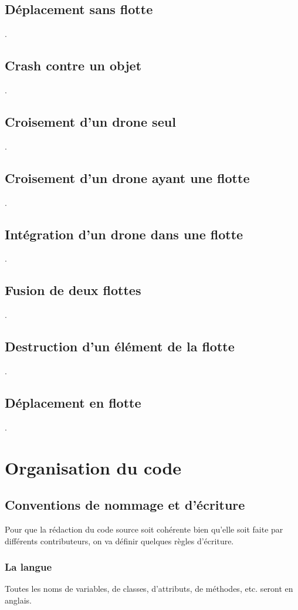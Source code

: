 \documentclass[11pt]{report}
\begin{document}
\subsection{Déplacement sans flotte}
.
\subsection{Crash contre un objet}
.
\subsection{Croisement d'un drone seul}
.
\subsection{Croisement d'un drone ayant une flotte}
.
\subsection{Intégration d'un drone dans une flotte}
.
\subsection{Fusion de deux flottes}
.
\subsection{Destruction d'un élément de la flotte}
.
\subsection{Déplacement en flotte}
.

\newpage
\section{\textbf{Organisation du code}}
\subsection{Conventions de nommage et d'écriture}

Pour que la rédaction du code source soit cohérente bien qu'elle soit faite par différents contributeurs, on va définir quelques règles d'écriture.

\subsubsection{La langue}

Toutes les noms de variables, de classes, d'attributs, de méthodes, etc. seront en anglais.
\end{document}
